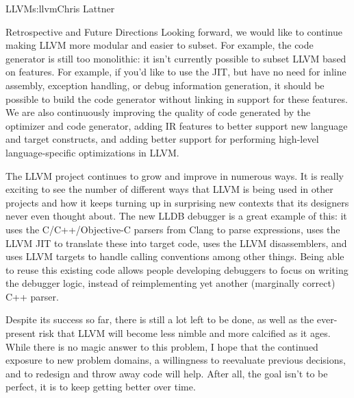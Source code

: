 \begin{aosachapter}{LLVM}{s:llvm}{Chris Lattner}
\begin{aosasect1}{Retrospective and Future Directions}
Looking forward, we would like to continue making LLVM more modular
and easier to subset.  For example, the code generator is still too
monolithic: it isn't currently possible to subset LLVM based on
features.  For example, if you'd like to use the JIT, but have no need
for inline assembly, exception handling, or debug information
generation, it should be possible to build the code generator without
linking in support for these features.  We are also continuously
improving the quality of code generated by the optimizer and code
generator, adding IR features to better support new language and
target constructs, and adding better support for performing high-level
language-specific optimizations in LLVM.

The LLVM project continues to grow and improve in numerous ways.  It
is really exciting to see the number of different ways that LLVM is
being used in other projects and how it keeps turning up in surprising
new contexts that its designers never even thought about.  The new
LLDB debugger is a great example of this: it uses the
C/C++/Objective-C parsers from Clang to parse expressions, uses the
LLVM JIT to translate these into target code, uses the LLVM
disassemblers, and uses LLVM targets to handle calling conventions
among other things.  Being able to reuse this existing code allows
people developing debuggers to focus on writing the debugger logic, instead of
reimplementing yet another (marginally correct) C++ parser.

Despite its success so far, there is still a lot left to be done, as
well as the ever-present risk that LLVM will become less nimble and
more calcified as it ages.  While there is no magic answer to this
problem, I hope that the continued exposure to new problem domains, a
willingness to reevaluate previous decisions, and to
redesign and throw away code will help.  After all, the goal isn't to
be perfect, it is to keep getting better over time.

\end{aosasect1}

\end{aosachapter}
